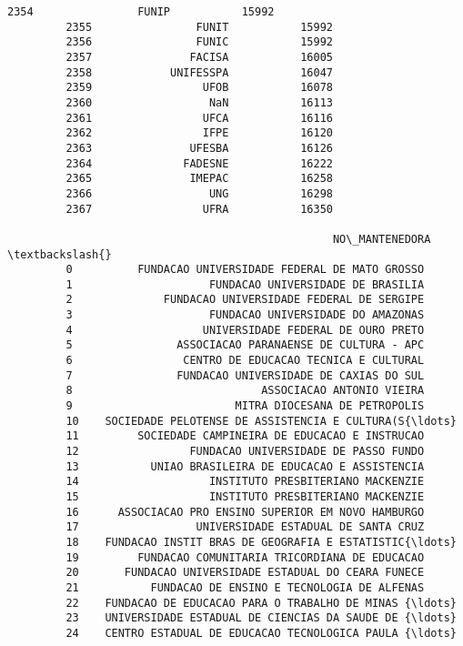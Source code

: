\documentclass[11pt]{article}
\begin{document}
\begin{Verbatim}[commandchars=\\\{\}]
         2354                FUNIP           15992   
         2355                FUNIT           15992   
         2356                FUNIC           15992   
         2357               FACISA           16005   
         2358            UNIFESSPA           16047   
         2359                 UFOB           16078   
         2360                  NaN           16113   
         2361                 UFCA           16116   
         2362                 IFPE           16120   
         2363               UFESBA           16126   
         2364              FADESNE           16222   
         2365               IMEPAC           16258   
         2366                  UNG           16298   
         2367                 UFRA           16350   
         
                                                  NO\_MANTENEDORA  \textbackslash{}
         0          FUNDACAO UNIVERSIDADE FEDERAL DE MATO GROSSO   
         1                     FUNDACAO UNIVERSIDADE DE BRASILIA   
         2              FUNDACAO UNIVERSIDADE FEDERAL DE SERGIPE   
         3                     FUNDACAO UNIVERSIDADE DO AMAZONAS   
         4                    UNIVERSIDADE FEDERAL DE OURO PRETO   
         5                ASSOCIACAO PARANAENSE DE CULTURA - APC   
         6                 CENTRO DE EDUCACAO TECNICA E CULTURAL   
         7                FUNDACAO UNIVERSIDADE DE CAXIAS DO SUL   
         8                             ASSOCIACAO ANTONIO VIEIRA   
         9                         MITRA DIOCESANA DE PETROPOLIS   
         10    SOCIEDADE PELOTENSE DE ASSISTENCIA E CULTURA(S{\ldots}   
         11         SOCIEDADE CAMPINEIRA DE EDUCACAO E INSTRUCAO   
         12                 FUNDACAO UNIVERSIDADE DE PASSO FUNDO   
         13           UNIAO BRASILEIRA DE EDUCACAO E ASSISTENCIA   
         14                    INSTITUTO PRESBITERIANO MACKENZIE   
         15                    INSTITUTO PRESBITERIANO MACKENZIE   
         16      ASSOCIACAO PRO ENSINO SUPERIOR EM NOVO HAMBURGO   
         17                  UNIVERSIDADE ESTADUAL DE SANTA CRUZ   
         18    FUNDACAO INSTIT BRAS DE GEOGRAFIA E ESTATISTIC{\ldots}   
         19         FUNDACAO COMUNITARIA TRICORDIANA DE EDUCACAO   
         20       FUNDACAO UNIVERSIDADE ESTADUAL DO CEARA FUNECE   
         21           FUNDACAO DE ENSINO E TECNOLOGIA DE ALFENAS   
         22    FUNDACAO DE EDUCACAO PARA O TRABALHO DE MINAS {\ldots}   
         23    UNIVERSIDADE ESTADUAL DE CIENCIAS DA SAUDE DE {\ldots}   
         24    CENTRO ESTADUAL DE EDUCACAO TECNOLOGICA PAULA {\ldots}   

\end{Verbatim}
\end{document}
